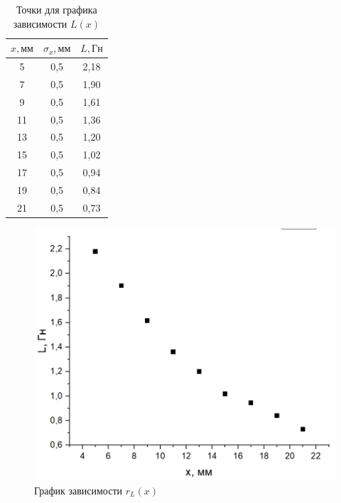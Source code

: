 \documentclass[a4paper, fontsize = 14pt]{article}
\begin{document}
\begin{table}[hbt]
\centering
\begin{tabular}{|c|c|c|}
\hline
\textbf{$x, мм$} & \textbf{$\sigma_x, мм$} & \textbf{$L, Гн$} \\ \hline
5                & 0,5                     & 2,18             \\ \hline
7                & 0,5                     & 1,90             \\ \hline
9                & 0,5                     & 1,61             \\ \hline
11               & 0,5                     & 1,36             \\ \hline
13               & 0,5                     & 1,20             \\ \hline
15               & 0,5                     & 1,02             \\ \hline
17               & 0,5                     & 0,94             \\ \hline
19               & 0,5                     & 0,84             \\ \hline
21               & 0,5                     & 0,73             \\ \hline
\end{tabular}
\caption{Точки для графика зависимости $L(x)$}
\end{table}

\begin{figure}
	\centering
	\includegraphics[scale=0.5]{lab48ris4.png}
	\caption{График зависимости $r_L(x)$}
\end{figure}
\end{document}
